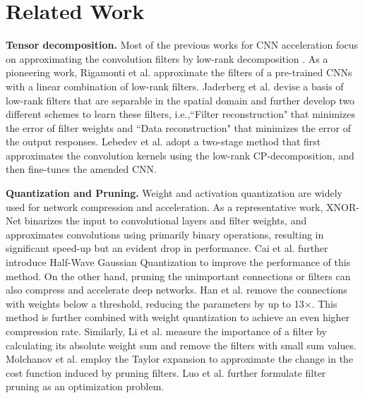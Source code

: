 \documentclass[letterpaper]{article} %
\begin{document}
\section{Related Work}
\noindent\textbf{Tensor decomposition. }Most of the previous works for CNN acceleration focus on approximating the convolution filters by low-rank decomposition \cite{rigamonti2013learning,jaderberg2014speeding,lebedev2014speeding,tai2015convolutional}. As a pioneering work, Rigamonti et al. \cite{rigamonti2013learning} approximate the filters of a pre-trained CNNs with a linear combination of low-rank filters. Jaderberg et al. \cite{jaderberg2014speeding} devise a basis of low-rank filters that are separable in the spatial domain and further develop two different schemes to learn these filters, i.e.,``Filter reconstruction" that minimizes the error of filter weights and ``Data reconstruction" that minimizes the error of the output responses. Lebedev et al. \cite{lebedev2014speeding} adopt a two-stage method that first approximates the convolution kernels using the low-rank CP-decomposition, and then fine-tunes the amended CNN. 

\noindent\textbf{Quantization and Pruning. }Weight and activation quantization are widely used for network compression and acceleration. As a representative work, XNOR-Net \cite{rastegari2016xnor} binarizes the input to convolutional layers and filter weights, and approximates convolutions using primarily binary operations, resulting in significant speed-up but an evident drop in performance. Cai et al. \cite{cai2017deep} further introduce Half-Wave Gaussian Quantization to improve the performance of this method. On the other hand, pruning the unimportant connections or filters can also compress and accelerate deep networks. Han et al. \cite{han2015deep} remove the connections with weights below a threshold, reducing the parameters by up to 13$\times$. This method is further combined with weight quantization to achieve an even higher compression rate. Similarly, Li et al. \cite{li2016pruning} measure the importance of a filter by calculating its absolute weight sum and remove the filters with small sum values. Molchanov et al. \cite{molchanov2016pruning} employ the Taylor expansion to approximate the change in the cost function induced by pruning filters. Luo et al. \cite{luo2017thinet} further formulate filter pruning as an optimization problem.
\end{document}
